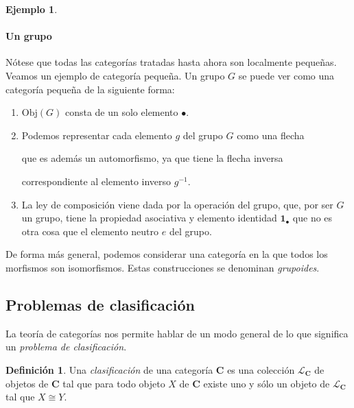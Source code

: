 \documentclass[12pt,a4paper]{book}
\theoremstyle{definition} \newtheorem{defn}[thm]{Definición}
\theoremstyle{definition} \newtheorem{ejemplo}[thm]{Ejemplo}
\theoremstyle{definition} \newtheorem{ejercicio}[thm]{Ejercicio}
\theoremstyle{remark} \newtheorem*{obs}{Observación}
\def\id{\mathbf{1}}
\def\obj{\mathrm{Obj}}
\def\cat{\mathbf{C}}
\begin{document}
\begin{ejemplo}
 

  \paragraph{Un grupo} Nótese que todas las categorías tratadas hasta ahora son localmente pequeñas. Veamos un ejemplo de categoría pequeña. Un grupo $G$ se puede ver como una categoría pequeña de la siguiente forma:
  \begin{enumerate}
    \item $\obj(G)$ consta de un solo elemento $\bullet$.
    \item Podemos representar cada elemento $g$ del grupo $G$ como una flecha
      \begin{center}
      \end{center}
      que es además un automorfismo, ya que tiene la flecha inversa
      \begin{center}
      \end{center}
      correspondiente al elemento inverso $g^{-1}$.
    \item La ley de composición viene dada por la operación del grupo, que, por ser $G$ un grupo, tiene la propiedad asociativa y elemento identidad $\id_{\bullet}$ que no es otra cosa que el elemento neutro $e$ del grupo.
  \end{enumerate}
  De forma más general, podemos considerar una categoría en la que todos los morfismos son isomorfismos. Estas construcciones se denominan \emph{grupoides}.
\end{ejemplo}

\subsection{Problemas de clasificación}

La teoría de categorías nos permite hablar de un modo general de lo que significa un \emph{problema de clasificación}.

\begin{defn}
  Una \emph{clasificación} de una categoría $\cat$ es una colección $\mathcal{L}_{\cat}$ de objetos de $\cat$ tal que para todo objeto $X$ de $\cat$ existe uno y sólo un objeto de $\mathcal{L}_{\cat}$ tal que $X\cong Y$. 
\end{defn}
\end{document}
